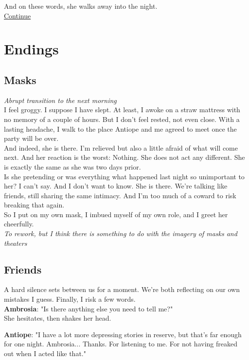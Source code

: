 \documentclass{report}
\newcommand{\dcomment}[1]{
	\emph{#1}
	\\
}
\newcommand{\speaker}[1]{
	\textbf{#1}: 
}
\newcommand{\glink}[2]{
	\hyperref[#1]{#2}
}
\newcommand{\gsection}[1]{
	\section*{#1}
	\label{#1}
}
\begin{document}
And on these words, she walks away into the night.\\

\glink{Masks}{Continue}

\chapter*{Endings}

\gsection{Masks}

\dcomment{
	Abrupt transition to the next morning
}

I feel groggy. I suppose I have slept. At least, I awoke on a straw mattress with no memory of a couple of hours. But I don't feel rested, not even close. With a lasting headache, I walk to the place Antiope and me agreed to meet once the party will be over.\\

And indeed, she is there. I'm relieved but also a little afraid of what will come next. And her reaction is the worst: Nothing. She does not act any different. She is exactly the same as she was two days prior.\\

Is she pretending or was everything what happened last night so unimportant to her? I can't say. And I don't want to know. She is there. We're talking like friends, still sharing the same intimacy. And I'm too much of a coward to risk breaking that again.\\

So I put on my own mask, I imbued myself of my own role, and I greet her cheerfully.\\

\dcomment{
	To rework, but I think there is something to do with the imagery of masks and theaters
}

\gsection{Friends}

A hard silence sets between us for a moment. We're both reflecting on our own mistakes I guess. Finally, I risk a few words.\\

\speaker{Ambrosia} "Is there anything else you need to tell me?"\\

She hesitates, then shakes her head.

\speaker{Antiope} "I have a lot more depressing stories in reserve, but that's far enough for one night. Ambrosia... Thanks. For listening to me. For not having freaked out when I acted like that."\\
\end{document}
